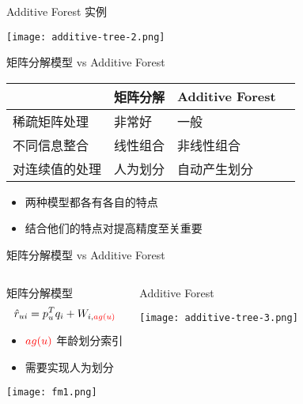 \documentclass{beamer}
\begin{document}
\begin{frame}{Additive Forest 实例}
    \begin{center}
        \texttt{[image: additive-tree-2.png]}
    \end{center}
\end{frame}

\begin{frame}{矩阵分解模型 vs Additive Forest}
    \begin{tabular}{ | l | l | l | p{5cm} |}
        \hline
           &矩阵分解 & Additive Forest \\
           \hline
        稀疏矩阵处理 & 非常好         &  一般\\ \hline
        不同信息整合 & 线性组合       & 非线性组合\\ \hline
        对连续值的处理 & 人为划分     & 自动产生划分 \\
        \hline
    \end{tabular}
    \pause
    \begin{itemize}
        \item 两种模型都各有各自的特点
        \item 结合他们的特点对提高精度至关重要
    \end{itemize}
\end{frame}

\begin{frame}{矩阵分解模型 vs Additive Forest}
        \pause
    \begin{columns}[t]
        \column{6cm}
        \begin{block}{矩阵分解模型}
        \begin{equation}
            \hat{r}_{ui} = 
            p_u^T q_i + W_{i, \textcolor{red}{ag(u)}}
            \label{}
        \end{equation}
        \begin{itemize}
        \item $\textcolor{red}{ag(u)}$ 年龄划分索引
        \item 需要实现人为划分
        \end{itemize}
        \begin{center}
            \texttt{[image: fm1.png]}
        \end{center}
        \end{block}

        \pause
        \column{6cm}
        \begin{block}{Additive Forest}
            \begin{center}
                \texttt{[image: additive-tree-3.png]}
            \end{center}
        \end{block}
    \end{columns}
\end{frame}
\end{document}
